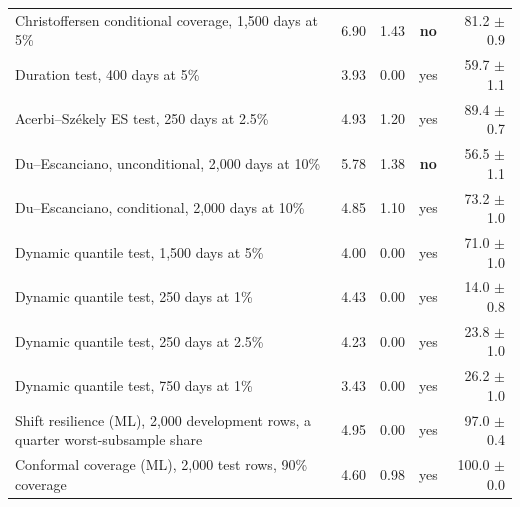 \begin{table}[htbp]
{\begin{tabular}{p{7.4cm}rrcr}
Christoffersen conditional coverage, 1,500 days at 5\% & 6.90 & 1.43 & \textbf{no} & 81.2 $\pm$ 0.9 \\
Duration test, 400 days at 5\% & 3.93 & 0.00 & yes & 59.7 $\pm$ 1.1 \\
Acerbi--Sz\'ekely ES test, 250 days at 2.5\% & 4.93 & 1.20 & yes & 89.4 $\pm$ 0.7 \\
Du--Escanciano, unconditional, 2,000 days at 10\% & 5.78 & 1.38 & \textbf{no} & 56.5 $\pm$ 1.1 \\
Du--Escanciano, conditional, 2,000 days at 10\% & 4.85 & 1.10 & yes & 73.2 $\pm$ 1.0 \\
Dynamic quantile test, 1,500 days at 5\% & 4.00 & 0.00 & yes & 71.0 $\pm$ 1.0 \\
Dynamic quantile test, 250 days at 1\% & 4.43 & 0.00 & yes & 14.0 $\pm$ 0.8 \\
Dynamic quantile test, 250 days at 2.5\% & 4.23 & 0.00 & yes & 23.8 $\pm$ 1.0 \\
Dynamic quantile test, 750 days at 1\% & 3.43 & 0.00 & yes & 26.2 $\pm$ 1.0 \\
Shift resilience (ML), 2,000 development rows, a quarter worst-subsample share & 4.95 & 0.00 & yes & 97.0 $\pm$ 0.4 \\
Conformal coverage (ML), 2,000 test rows, 90\% coverage & 4.60 & 0.98 & yes & 100.0 $\pm$ 0.0 \\
\bottomrule
\end{tabular}}
\end{table}
